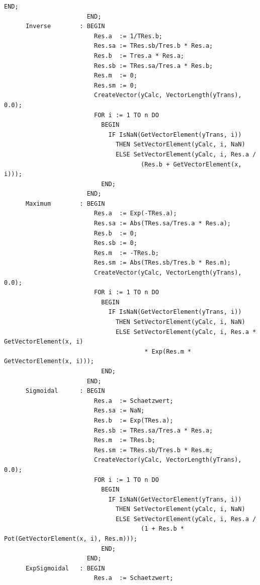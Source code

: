 \begin{refsection}
\begin{lstlisting}[caption=Linearisation of curved data]
                           END;
                       END;
      Inverse        : BEGIN
                         Res.a  := 1/TRes.b;
                         Res.sa := TRes.sb/Tres.b * Res.a;
                         Res.b  := Tres.a * Res.a;
                         Res.sb := TRes.sa/Tres.a * Res.b;
                         Res.m  := 0;
                         Res.sm := 0;
                         CreateVector(yCalc, VectorLength(yTrans), 0.0);
                         FOR i := 1 TO n DO
                           BEGIN
                             IF IsNaN(GetVectorElement(yTrans, i))
                               THEN SetVectorElement(yCalc, i, NaN)
                               ELSE SetVectorElement(yCalc, i, Res.a /
                                      (Res.b + GetVectorElement(x, i)));
                           END;
                       END;
      Maximum        : BEGIN
                         Res.a  := Exp(-TRes.a);
                         Res.sa := Abs(TRes.sa/Tres.a * Res.a);
                         Res.b  := 0;
                         Res.sb := 0;
                         Res.m  := -TRes.b;
                         Res.sm := Abs(TRes.sb/Tres.b * Res.m);
                         CreateVector(yCalc, VectorLength(yTrans), 0.0);
                         FOR i := 1 TO n DO
                           BEGIN
                             IF IsNaN(GetVectorElement(yTrans, i))
                               THEN SetVectorElement(yCalc, i, NaN)
                               ELSE SetVectorElement(yCalc, i, Res.a * GetVectorElement(x, i)
                                       * Exp(Res.m * GetVectorElement(x, i)));
                           END;
                       END;
      Sigmoidal      : BEGIN
                         Res.a  := Schaetzwert;
                         Res.sa := NaN;
                         Res.b  := Exp(TRes.a);
                         Res.sb := TRes.sa/Tres.a * Res.a;
                         Res.m  := TRes.b;
                         Res.sm := TRes.sb/Tres.b * Res.m;
                         CreateVector(yCalc, VectorLength(yTrans), 0.0);
                         FOR i := 1 TO n DO
                           BEGIN
                             IF IsNaN(GetVectorElement(yTrans, i))
                               THEN SetVectorElement(yCalc, i, NaN)
                               ELSE SetVectorElement(yCalc, i, Res.a /
                                      (1 + Res.b * Pot(GetVectorElement(x, i), Res.m)));
                           END;
                       END;
      ExpSigmoidal   : BEGIN
                         Res.a  := Schaetzwert;

\end{lstlisting}
\end{refsection}
